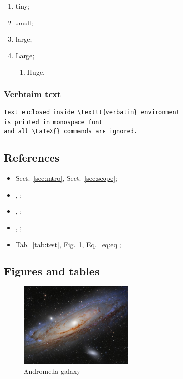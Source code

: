 \begin{enumerate}
\item {\tiny tiny};
\item {\small small};
\item {\large large};
\item {\Large Large};
  \begin{enumerate}
  \item {\Huge Huge}.
  \end{enumerate}
\end{enumerate}


\subsubsection{Verbtaim text}

\begin{verbatim}
Text enclosed inside \texttt{verbatim} environment
is printed in monospace font
and all \LaTeX{} commands are ignored.
\end{verbatim}


\subsection{References}

\begin{itemize}
\item Sect.~\ref{sec:intro}, Sect.~\ref{sec:scope};
\item {}, ;
\item {}, ;
\item {}, ;
\item Tab.~\ref{tab:test}, Fig.~\ref{fig:m31}, Eq.~\ref{eq:eq};
\end{itemize}


\subsection{Figures and tables}

\begin{figure}[hbtp!]
  \centering
  \includegraphics[width=0.5\textwidth]{media/m31}
  \caption{Andromeda galaxy}
    \label{fig:m31}
\end{figure}


